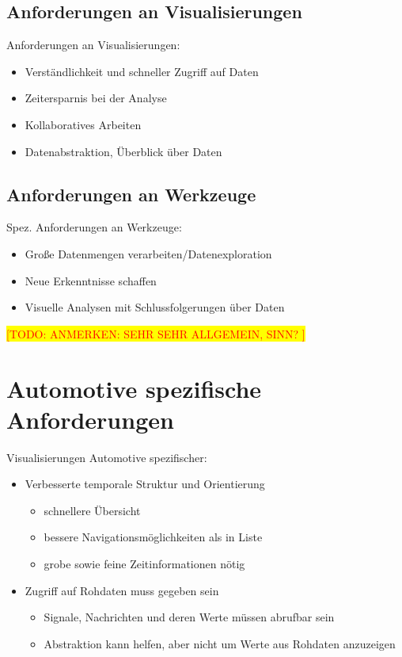 \documentclass[draft=false
              ,paper=a4
              ,twoside=false
              ,fontsize=11pt
              ,headsepline
              ,BCOR10mm
              ,DIV11
              ]{scrbook}
\newcommand{\TODO}[1]{\colorbox{yellow}{\textcolor{red}{[TODO: #1]}}}
\begin{document}
\subsection{Anforderungen an Visualisierungen} %
\label{sub:anforderungen_an_visualisierungen}

Anforderungen an Visualisierungen:

\begin{itemize}
  \item Verständlichkeit und schneller Zugriff auf Daten
  \item Zeitersparnis bei der Analyse
  \item Kollaboratives Arbeiten
  \item Datenabstraktion, Überblick über Daten
\end{itemize}

\subsection{Anforderungen an Werkzeuge} %
\label{sub:anforderungen_an_werkzeuge}

Spez. Anforderungen an Werkzeuge:

\begin{itemize}
  \item Große Datenmengen verarbeiten/Datenexploration 
  \item Neue Erkenntnisse schaffen
  \item Visuelle Analysen mit Schlussfolgerungen über Daten
\end{itemize}

\TODO{ANMERKEN: SEHR SEHR ALLGEMEIN, SINN? }


\section{Automotive spezifische Anforderungen} %
\label{sec:automotive_spezifische_anforderungen}
Visualisierungen Automotive spezifischer:

\begin{itemize}
  \item Verbesserte temporale Struktur und Orientierung
    \begin{itemize}
    \item schnellere Übersicht
    \item bessere Navigationsmöglichkeiten als in Liste
    \item grobe sowie feine Zeitinformationen nötig
  \end{itemize}
  \item Zugriff auf Rohdaten muss gegeben sein
  \begin{itemize}
    \item Signale, Nachrichten und deren Werte müssen abrufbar sein
    \item Abstraktion kann helfen, aber nicht um Werte aus Rohdaten anzuzeigen
  \end{itemize}
\end{itemize}
\end{document}
